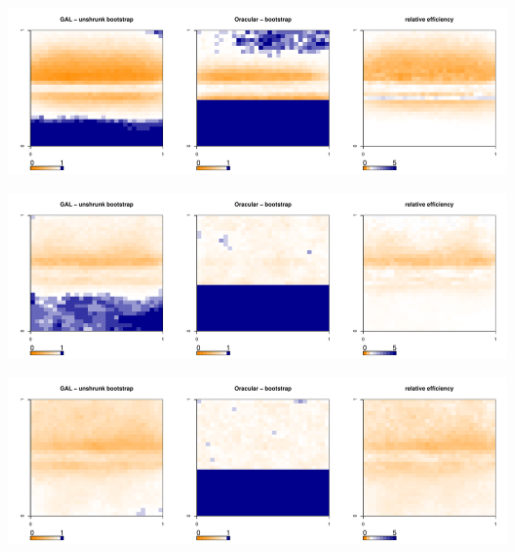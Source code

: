 \documentclass[authoryear, review, 11pt]{elsarticle}
\begin{document}
	\begin{center}
		\includegraphics[width=0.99\textwidth]{../../figures/X1-28-13.pdf}
		\label{fig:coveragemap13}
	\end{center}
        
	\begin{center}
		\includegraphics[width=0.99\textwidth]{../../figures/X1-28-14.pdf}
		\label{fig:coveragemap14}
	\end{center}
	
	\begin{center}
		\includegraphics[width=0.99\textwidth]{../../figures/X1-28-15.pdf}
		\label{fig:coveragemap15}
	\end{center}
	
\end{document}
